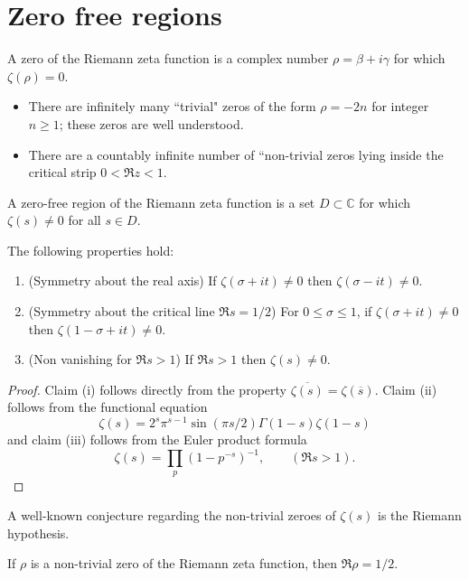 \chapter{Zero free regions}\label{zerofree-chapter}
A zero of the Riemann zeta function is a complex number $\rho = \beta + i\gamma$ for which $\zeta(\rho) = 0$.
\begin{itemize}
    \item There are infinitely many ``trivial" zeros of the form $\rho = -2n$ for integer $n \ge 1$; these zeros are well understood.
    \item There are a countably infinite number of ``non-trivial zeros lying inside the critical strip $0 < \Re z < 1$.
\end{itemize}

\begin{definition}\label{zeta-zero-free-def}A zero-free region of the Riemann zeta function is a set $D \subset \mathbb{C}$ for which $\zeta(s) \ne 0$ for all $s \in D$.
\end{definition}

\begin{lemma}\label{zero-free-basic-lem}
The following properties hold:
\begin{enumerate}
    \item[(i)] (Symmetry about the real axis) If $\zeta(\sigma + it) \ne 0$ then $\zeta(\sigma - it) \ne 0$.
    \item[(ii)] (Symmetry about the critical line $\Re s = 1/2$) For $0 \le \sigma \le 1$, if $\zeta(\sigma + it) \ne 0$ then $\zeta(1 - \sigma + it) \ne 0$.
    \item[(iii)] (Non vanishing for $\Re s > 1$) If $\Re s > 1$ then $\zeta(s) \ne 0$.
\end{enumerate}
\end{lemma}
\begin{proof}
Claim (i) follows directly from the property $\overline{\zeta(s)} = \zeta(\overline{s})$. Claim (ii) follows from the functional equation
\[
\zeta(s) = 2^s \pi^{s - 1}\sin(\pi s/2) \Gamma(1 -s)\zeta(1-s)
\]
and claim (iii) follows from the Euler product formula
\[
\zeta(s) = \prod_{p}(1 - p^{-s})^{-1},\qquad (\Re s > 1).
\]
\end{proof}

A well-known conjecture regarding the non-trivial zeroes of $\zeta(s)$ is the Riemann hypothesis.

\begin{conjecture}\label{rh}
If $\rho$ is a non-trivial zero of the Riemann zeta function, then $\Re \rho = 1/2$.
\end{conjecture}


